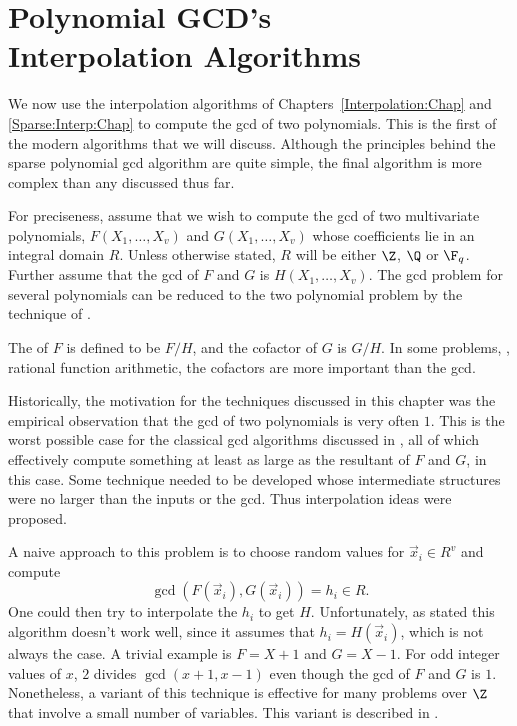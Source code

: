 \chapter[Polynomial GCD's: Interpolation Algorithms]{Polynomial GCD's\\Interpolation Algorithms}
\label{Poly:GCD:Chap}


We now use the interpolation algorithms of
Chapters~\ref{Interpolation:Chap} and \ref{Sparse:Interp:Chap} to
compute the {\sc gcd} of two polynomials.  This is the first of the
modern algorithms that we will discuss.  Although the principles
behind the sparse polynomial {\sc gcd} algorithm are quite simple, the
final algorithm is more complex than any discussed thus far.

For preciseness, assume that we wish to compute the {\sc gcd} of two
multivariate polynomials, $F(X_1, \ldots, X_v)$ and $G(X_1, \ldots,
X_v)$ whose coefficients lie in an integral domain $R$.  Unless
otherwise stated, $R$ will be either $\Z$, $\Q$ or $\F_q$.  Further
assume that the {\sc gcd} of $F$ and $G$ is $H(X_1, \ldots, X_v)$.
The {\sc gcd} problem for several polynomials can be reduced to the
two polynomial problem by the technique of .

The  of $F$ is defined to be $F/H$, and the cofactor of
$G$ is $G/H$.  In some problems, \eg, rational function arithmetic, the
cofactors are more important than the {\sc gcd}.

Historically, the motivation for the techniques discussed in this
chapter was the empirical observation that the {\sc gcd} of two
polynomials is very often $1$.  This is the worst possible case for
the classical {\sc gcd} algorithms discussed in ,
all of which effectively compute something at least as large as the
resultant of $F$ and $G$, in this case.  Some technique needed to be
developed whose intermediate structures were no larger than the inputs
or the {\sc gcd}.  Thus interpolation ideas were proposed.

A naive approach to this problem is to choose random values for
$\vec{x}_i \in R^v$ and compute 
\[
\gcd(F(\vec{x}_i), G(\vec{x}_i)) = h_i \in R.
\]
One could then try to interpolate the $h_i$ to get $H$.
Unfortunately, as stated this algorithm doesn't work well, since it
assumes that $h_i = H(\vec{x}_i)$, which is not always the case.  A
trivial example is $F = X+1$ and $G = X-1$.  For odd integer values of
$x$, $2$ divides $\gcd(x+1, x-1)$ even though the {\sc gcd} of $F$ and $G$
is $1$.  Nonetheless, a variant of this technique is effective for
many problems over $\Z$ that involve a small number of variables.
This variant is described in .


